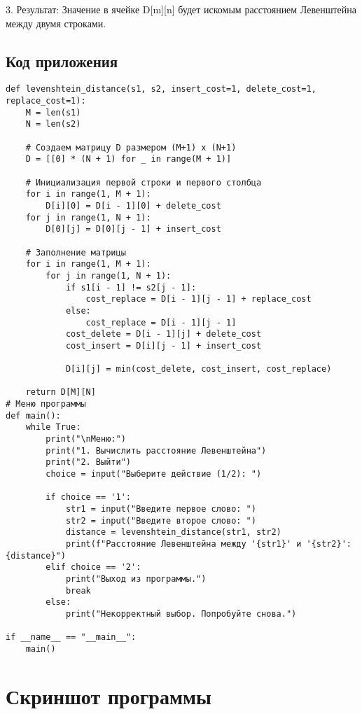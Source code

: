\documentclass[12pt,a4paper]{scrartcl}
\begin{document}
3. Результат:
Значение в ячейке D[m][n] будет искомым расстоянием Левенштейна между двумя строками.

\subsection{Код приложения}


\begin{verbatim}
def levenshtein_distance(s1, s2, insert_cost=1, delete_cost=1, replace_cost=1):
    M = len(s1)
    N = len(s2)

    # Создаем матрицу D размером (M+1) x (N+1)
    D = [[0] * (N + 1) for _ in range(M + 1)]

    # Инициализация первой строки и первого столбца
    for i in range(1, M + 1):
        D[i][0] = D[i - 1][0] + delete_cost
    for j in range(1, N + 1):
        D[0][j] = D[0][j - 1] + insert_cost

    # Заполнение матрицы
    for i in range(1, M + 1):
        for j in range(1, N + 1):
            if s1[i - 1] != s2[j - 1]:
                cost_replace = D[i - 1][j - 1] + replace_cost
            else:
                cost_replace = D[i - 1][j - 1]
            cost_delete = D[i - 1][j] + delete_cost
            cost_insert = D[i][j - 1] + insert_cost

            D[i][j] = min(cost_delete, cost_insert, cost_replace)

    return D[M][N]
# Меню программы
def main():
    while True:
        print("\nМеню:")
        print("1. Вычислить расстояние Левенштейна")
        print("2. Выйти")
        choice = input("Выберите действие (1/2): ")

        if choice == '1':
            str1 = input("Введите первое слово: ")
            str2 = input("Введите второе слово: ")
            distance = levenshtein_distance(str1, str2)
            print(f"Расстояние Левенштейна между '{str1}' и '{str2}': {distance}")
        elif choice == '2':
            print("Выход из программы.")
            break
        else:
            print("Некорректный выбор. Попробуйте снова.")

if __name__ == "__main__":
    main()

\end{verbatim}


\section{Скриншот программы}
\label{sec:program-shots}
\end{document}
